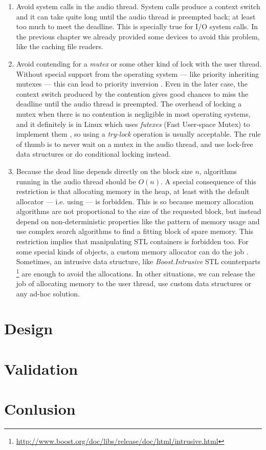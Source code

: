 \begin{enumerate}

\item Avoid system calls in the audio thread. System calls produce a
  context switch and it can take quite long until the audio thread is
  preempted back; at least too much to meet the deadline. This is
  specially true for I/O system calls. In the previous chapter we
  already provided some devices to avoid this problem, like the
  caching file readers.

\item Avoid contending for a \emph{mutex} or some other kind of lock
  with the user thread. Without special support from the operating
  system --- like priority inheriting mutexes --- this can lead to
  priority inversion \cite{kim03basic}. Even in the later case, the
  context switch produced by the contention gives good chances to miss
  the deadline until the audio thread is preempted. The overhead of
  locking a mutex when there is no contention is negligible in most
  operating systems, and it definitely is in Linux which uses
  \emph{futexes} (Fast User-space Mutex) to implement them
  \cite{franke02futex}, so using a \emph{try-lock} operation is
  usually acceptable. The rule of thumb is to never wait on a mutex in
  the audio thread, and use lock-free data structures
  \cite{valois96lockfree} or do conditional locking instead.

\item Because the dead line depends directly on the block size $n$,
  algorithms running in the audio thread should be $O(n)$. A special
  consequence of this restriction is that allocating memory in the
  heap, at least with the default allocator --- i.e. using 
  --- is forbidden. This is so because memory allocation algorithms
  are not proportional to the size of the requested block, but instead
  depend on non-deterministic properties like the pattern of memory
  usage and use complex search algorithms to find a fitting block of
  spare memory. This restriction implies that manipulating STL
  containers is forbidden too. For some special kinds of objects, a
  custom memory allocator can do the job
  \cite{alexandrescu01modern}. Sometimes, an intrusive data structure,
  like \emph{Boost.Intrusive} STL counterparts
  \footnote{\url{http://www.boost.org/doc/libs/release/doc/html/intrusive.html}}
  are enough to avoid the allocations. In other situations, we can
  release the job of allocating memory to the user thread, use custom
  data structures or any ad-hoc solution.
\end{enumerate}



\section{Design}

\label{sec:modports}

\section{Validation}

\section{Conlusion}

